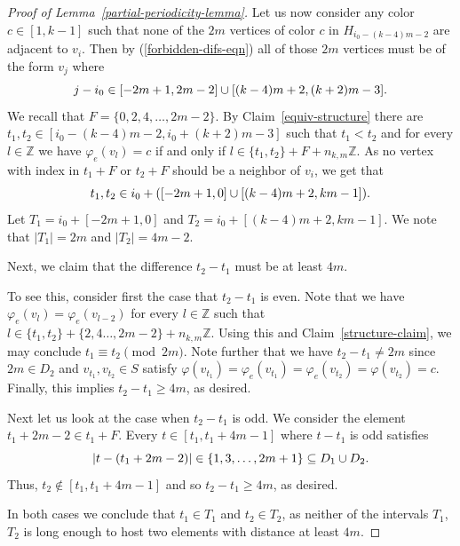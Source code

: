 \documentclass[a4paper,10pt,hidelinks]{amsart}
\renewcommand{\phi}{\ensuremath{\varphi}}
\newenvironment{claimproof}[1][\proofname]{\proof[#1]\renewcommand{\qedsymbol}{$\blacksquare$}}{\endproof}
\theoremstyle{definition}
\begin{document}
\begin{proof}[Proof of Lemma~\ref{partial-periodicity-lemma}]
\begin{claimproof}
        Let us now consider any color $c\in [1,k-1]$ such that none of the $2m$ vertices of color $c$ in $H_{i_0 - (k - 4)m - 2}$ are adjacent to $v_i$. Then by (\ref{forbidden-difs-eqn}) all of those $2m$ vertices must be of the form $v_j$ where 
        \begin{equation}\notag
            j - i_0 \in [- 2m + 1, 2m - 2] \cup [(k-4)m + 2, (k + 2)m - 3].
        \end{equation}
        We recall that $F=\{0, 2, 4, \dots, 2m -2\}$. By Claim~\ref{equiv-structure} there are $t_1, t_2 \in [i_0 - (k - 4)m - 2, i_0 + (k + 2)m - 3]$ such that $t_1 < t_2$ and for every $l\in \mathbb{Z}$ we have $\varphi_e(v_l) = c$ if and only if $l \in \{t_1, t_2\} + F + n_{k,m}\mathbb{Z}$. 
        As no vertex with index in $t_1 + F$ or $t_2 + F$ should be a neighbor of $v_i$, we get that 
        \begin{equation}\notag
            t_1, t_2 \in i_0 + ([-2m + 1, 0] \cup [(k-4)m + 2, km - 1]). 
        \end{equation}
        Let $T_1 = i_0 + [-2m + 1, 0]$ and $T_2 = i_0 + [(k-4)m + 2, km - 1]$. We note that $|T_1| = 2m$ and $|T_2| = 4m - 2$. 

        Next, we claim that the difference $t_2 - t_1$ must be at least $4m$. 
        
        To see this, consider first the case that $t_2 - t_1$ is even. Note that we have $\phi_e(v_l)=\phi_e(v_{l-2})$ for every $l\in \mathbb{Z}$ such that $l\in \{t_1,t_2\}+\{2,4\ldots,2m-2\}+n_{k,m}\mathbb{Z}$. Using this and Claim~\ref{structure-claim}, we may conclude $t_1 \equiv t_2 \pmod{2m}$. Note further that we have $t_2-t_1\neq 2m$ since $2m\in D_2$ and $v_{t_1}, v_{t_2}\in S$ satisfy $\phi(v_{t_1})=\phi_e(v_{t_1})=\phi_e(v_{t_2})=\phi(v_{t_2})=c$. Finally, this implies $t_2- t_1 \geq 4m$, as desired. 
        
        Next let us look at the case when $t_2 - t_1$ is odd. We consider the element $t_1 + 2m - 2 \in t_1 + F$. Every $t \in [t_1, t_1 + 4m -1]$ where $t - t_1$ is odd satisfies 
        \begin{equation}\notag
            |t - (t_1 + 2m - 2)| \in  \{1, 3, \dots, 2m + 1\} \subseteq D_1 \cup D_2.
        \end{equation}   
        Thus, $t_2\notin [t_1,t_1+4m-1]$ and so $t_2 - t_1 \geq 4m$, as desired.

        In both cases we conclude that $t_1\in T_1$ and $t_2\in T_2$, as neither of the intervals $T_1$, $T_2$ is long enough to host two elements with distance at least $4m$.


\end{claimproof}
\end{proof}
\end{document}
